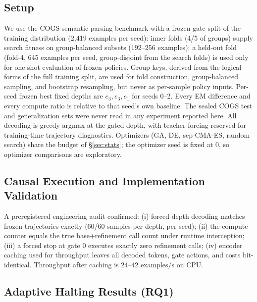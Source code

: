 ﻿\documentclass[11pt]{article}
\begin{document}
\subsection{Setup}
\label{sec:setup}
We use the COGS semantic parsing benchmark \citep{kim2020cogs} with a frozen gate split of the training distribution (2{,}419 examples per seed): inner folds (4/5 of groups) supply search fitness on group-balanced subsets (192--256 examples); a held-out fold (fold-4, 645 examples per seed, group-disjoint from the search folds) is used only for one-shot evaluation of frozen policies. Group keys, derived from the logical forms of the full training split, are used for fold construction, group-balanced sampling, and bootstrap resampling, but never as per-sample policy inputs. Per-seed frozen best fixed depths are $e_3, e_3, e_1$ for seeds 0--2. Every EM difference and every compute ratio is relative to that seed's own baseline. The sealed COGS test and generalization sets were never read in any experiment reported here. All decoding is greedy argmax at the gated depth, with teacher forcing reserved for training-time trajectory diagnostics. Optimizers (GA, DE, sep-CMA-ES, random search) share the budget of \S\ref{sec:stats}; the optimizer seed is fixed at 0, so optimizer comparisons are exploratory.

\subsection{Causal Execution and Implementation Validation}
A preregistered engineering audit confirmed: (i) forced-depth decoding matches frozen trajectories exactly (60/60 samples per depth, per seed); (ii) the compute counter equals the true base+refinement call count under runtime interception; (iii) a forced stop at gate 0 executes exactly zero refinement calls; (iv) encoder caching used for throughput leaves all decoded tokens, gate actions, and costs bit-identical. Throughput after caching is 24--42 examples/s on CPU.

\subsection{Adaptive Halting Results (RQ1)}
\label{sec:exp-halting}
\end{document}
